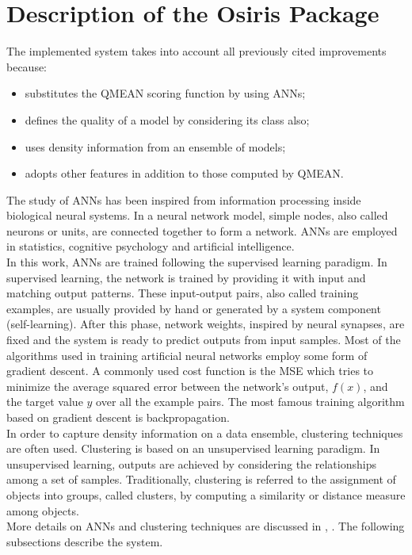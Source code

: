 \section{Description of the Osiris Package}
\label{sec:a_raw_neural_network}
The implemented system takes into account all previously cited improvements because:
\begin{itemize}
\item substitutes the QMEAN scoring function by using ANNs;
\item defines the quality of a model by considering its class also;
\item uses density information from an ensemble of models;
\item adopts other features in addition to those computed by QMEAN.
\end{itemize}
The study of ANNs has been inspired from information processing inside biological neural systems. In a neural network model, simple nodes, also called neurons or units, are connected together to form a network. ANNs are employed in statistics, cognitive psychology and artificial intelligence.\\
In this work, ANNs are trained following the supervised learning paradigm. In supervised learning, the network is trained by providing it with input and matching output patterns. These input-output pairs, also called training examples, are usually provided by hand or generated by a system component (self-learning). After this phase, network weights, inspired by neural synapses, are fixed and the system is ready to predict outputs from input samples. Most of the algorithms used in training artificial neural networks employ some form of gradient descent. A commonly used cost function is the \gls{MSE} which tries to minimize the average squared error between the network's output, $f(x)$, and the target value $y$ over all the example pairs. The most famous training algorithm based on gradient descent is backpropagation.\\
In order to capture density information on a data ensemble, clustering techniques are often used. Clustering is based on an unsupervised learning paradigm. In unsupervised learning, outputs are achieved by considering the relationships among a set of samples. Traditionally, clustering is referred to the assignment of objects into groups, called clusters, by computing a similarity or distance measure among objects.\\
More details on ANNs and clustering techniques are discussed in \cite{Baldi2001aa}, \cite{Mitchell1997aa}. The following subsections describe the system.

